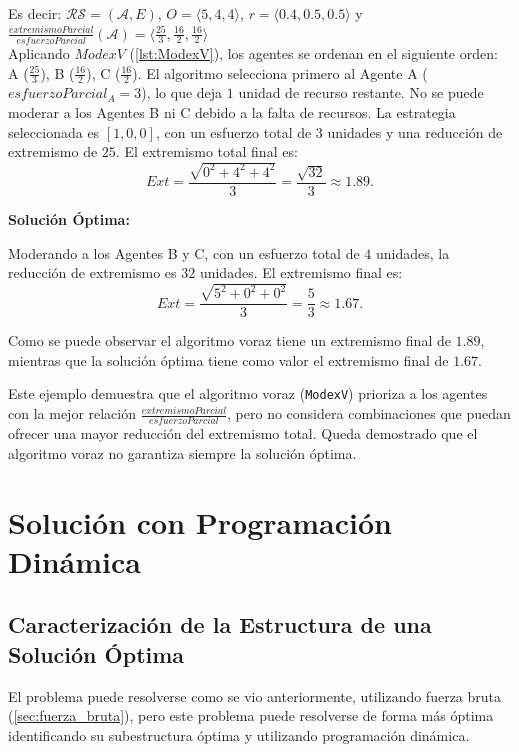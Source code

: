 \documentclass[letterpaper,10pt]{article}
\begin{document}
Es decir: $\mathcal{R} \mathcal{S} = (\mathcal{A},E)$, $O=\langle 5,4,4 \rangle$, $r=\langle 0.4, 0.5, 0.5\rangle$ y $\frac{extremismoParcial}{esfuerzoParcial}(\mathcal{A})=\langle \frac{25}{3},\frac{16}{2},\frac{16}{2} \rangle $
\\

Aplicando $ModexV$ (\ref{lst:ModexV}), los agentes se ordenan en el siguiente orden: A ($\frac{25}{3}$), B ($\frac{16}{2}$), C ($\frac{16}{2}$). El algoritmo selecciona primero al Agente A (\(esfuerzoParcial_A = 3\)), lo que deja \(1\) unidad de recurso restante. No se puede moderar a los Agentes B ni C debido a la falta de recursos. La estrategia seleccionada es \([1, 0, 0]\), con un esfuerzo total de \(3\) unidades y una reducción de extremismo de \(25\). El extremismo total final es:
\[
Ext = \frac{\sqrt{0^2 + 4^2 + 4^2}}{3} = \frac{\sqrt{32}}{3} \approx 1.89.
\]

\textbf{Solución Óptima:}  

Moderando a los Agentes B y C, con un esfuerzo total de \(4\) unidades, la reducción de extremismo es \(32\) unidades. El extremismo final es:
\[
Ext = \frac{\sqrt{5^2 + 0^2 + 0^2}}{3} = \frac{5}{3} \approx 1.67.
\]

Como se puede observar el algoritmo voraz tiene un extremismo final de \(1.89\), mientras que la solución óptima tiene como valor el extremismo final de \(1.67\).
 
Este ejemplo demuestra que el algoritmo voraz (\texttt{ModexV}) prioriza a los agentes con la mejor relación $\frac{extremismoParcial}{esfuerzoParcial}$, pero no considera combinaciones que puedan ofrecer una mayor reducción del extremismo total. Queda demostrado que el algoritmo voraz no garantiza siempre la solución óptima.

\section{Solución con Programación Dinámica}
\label{sec:programacion_dinamica}
\subsection{Caracterización de la Estructura de una Solución Óptima}
\label{subsec:caracterizacion_solucion_optima}
El problema puede resolverse como se vio anteriormente, utilizando fuerza bruta (\ref{sec:fuerza_bruta}), pero este problema puede resolverse de forma más óptima identificando su subestructura óptima y utilizando programación dinámica.
\end{document}
